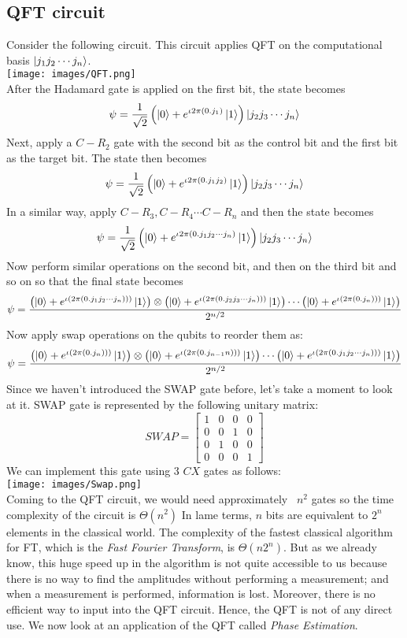 \documentclass{article}
\begin{document}
\subsection{QFT circuit}
Consider the following circuit. This circuit applies QFT on the computational basis $\ket{j_1j_2 \cdots j_n}$.\\
\texttt{[image: images/QFT.png]}\\
After the Hadamard gate is applied on the first bit, the state becomes $$\psi = \frac{1}{\sqrt{2}} \left( \ket{0} + e^{\iota 2\pi (0.j_1)} \ket{1}\right)\ket{j_2j_3 \cdots j_n}$$
Next, apply a $C-R_2$ gate with the second bit as the control bit and the first bit as the target bit. The state then becomes
$$\psi = \frac{1}{\sqrt{2}} \left( \ket{0} + e^{\iota 2\pi (0.j_1j_2)} \ket{1}\right)\ket{j_2j_3 \cdots j_n}$$
In a similar way, apply $C-R_3, C-R_4 \cdots C-R_n$ and then the state becomes $$\psi = \frac{1}{\sqrt{2}} \left( \ket{0} + e^{\iota 2\pi (0.j_1j_2 \cdots j_n)} \ket{1}\right)\ket{j_2j_3 \cdots j_n}$$
Now perform similar operations on the second bit, and then on the third bit and so on so that the final state becomes 
$$\psi = \frac{\left( \ket{0} + e^{\iota(2\pi (0.j_1j_2 \cdots j_n)))}\ket{1}\right)\otimes  \left( \ket{0} + e^{\iota(2\pi (0.j_2j_3 \cdots j_n)))}\ket{1}\right) \cdots \left( \ket{0} + e^{\iota(2\pi (0.j_n)))}\ket{1}\right)}{2^{n/2}}$$
Now apply swap operations on the qubits to reorder them as:
$$\psi = \frac{\left( \ket{0} + e^{\iota(2\pi (0.j_n)))}\ket{1}\right)\otimes  \left( \ket{0} + e^{\iota(2\pi (0.j_{n-1}{n})))}\ket{1}\right) \cdots \left( \ket{0} + e^{\iota(2\pi (0.j_1j_2 \cdots j_n)))}\ket{1}\right)}{2^{n/2}}$$
Since we haven't introduced the SWAP gate before, let's take a moment to look at it. SWAP gate is represented by the following unitary matrix:
$$SWAP = \begin{bmatrix}
1 & 0 & 0 & 0 \\
0 & 0 & 1 & 0 \\
0 & 1 & 0 & 0 \\
0 & 0 & 0 & 1
\end{bmatrix}$$
We can implement this gate using 3 $CX$ gates as follows:\\
\texttt{[image: images/Swap.png]}\\
Coming to the QFT circuit, we would need approximately ~$n^2$ gates so the time complexity of the circuit is $\Theta(n^2)$
In lame terms, $n$ bits are equivalent to $2^n$ elements in the classical world. The complexity of the fastest classical algorithm for FT, which is the \textit{Fast Fourier Transform}, is $\Theta(n2^n)$. But as we already know, this huge speed up in the algorithm is not quite accessible to us because there is no way to find the amplitudes without performing a measurement; and when a measurement is performed, information is lost. Moreover, there is no efficient way to input into the QFT circuit. Hence, the QFT is not of any direct use. We now look at an application of the QFT called \textit{Phase Estimation}.
\cleardoublepage
\end{document}

